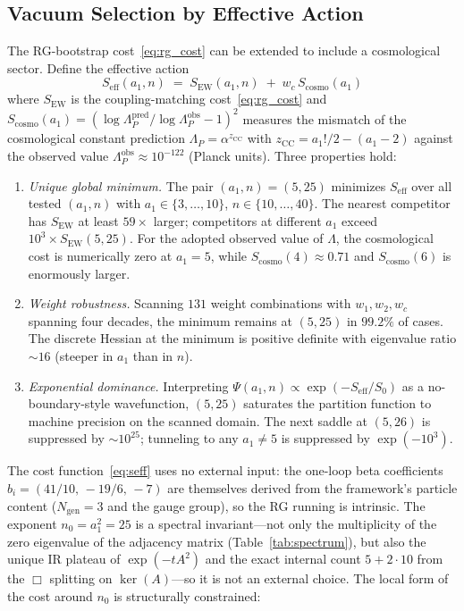 \documentclass[12pt,a4paper]{article}
\theoremstyle{definition}
\begin{document}
\subsection{Vacuum Selection by Effective Action}
\label{sec:vacuum_selection}

The RG-bootstrap cost~\eqref{eq:rg_cost} can be extended to include a cosmological sector.  Define the effective action
\begin{equation}
S_{\mathrm{eff}}(a_1, n) \;=\; S_{\mathrm{EW}}(a_1, n) \;+\; w_c\, S_{\mathrm{cosmo}}(a_1)
\label{eq:seff}
\end{equation}
where $S_{\mathrm{EW}}$ is the coupling-matching cost~\eqref{eq:rg_cost} and $S_{\mathrm{cosmo}}(a_1) = (\log\Lambda_P^{\mathrm{pred}} / \log\Lambda_P^{\mathrm{obs}} - 1)^2$ measures the mismatch of the cosmological constant prediction $\Lambda_P = \alpha^{z_{\mathrm{CC}}}$ with $z_{\mathrm{CC}} = a_1!/2 - (a_1-2)$ against the observed value $\Lambda_P^{\mathrm{obs}} \approx 10^{-122}$ (Planck units).  Three properties hold:
\begin{enumerate}
\item[(i)] \emph{Unique global minimum.}  The pair $(a_1, n) = (5, 25)$ minimizes $S_{\mathrm{eff}}$ over all tested $(a_1, n)$ with $a_1 \in \{3, \ldots, 10\}$, $n \in \{10, \ldots, 40\}$.  The nearest competitor has $S_{\mathrm{EW}}$ at least $59\times$ larger; competitors at different $a_1$ exceed $10^3 \times S_{\mathrm{EW}}(5,25)$.  For the adopted observed value of $\Lambda$, the cosmological cost is numerically zero at $a_1=5$, while $S_{\mathrm{cosmo}}(4) \approx 0.71$ and $S_{\mathrm{cosmo}}(6)$ is enormously larger.
\item[(ii)] \emph{Weight robustness.}  Scanning $131$ weight combinations with $w_1, w_2, w_c$ spanning four decades, the minimum remains at $(5, 25)$ in $99.2\%$ of cases.  The discrete Hessian at the minimum is positive definite with eigenvalue ratio $\sim\!16$ (steeper in $a_1$ than in $n$).
\item[(iii)] \emph{Exponential dominance.}  Interpreting $\Psi(a_1,n) \propto \exp(-S_{\mathrm{eff}}/S_0)$ as a no-boundary-style wavefunction, $(5,25)$ saturates the partition function to machine precision on the scanned domain.  The next saddle at $(5,26)$ is suppressed by $\sim 10^{25}$; tunneling to any $a_1 \neq 5$ is suppressed by $\exp(-10^3)$.
\end{enumerate}
The cost function~\eqref{eq:seff} uses no external input: the one-loop beta coefficients $b_i = (41/10,\,-19/6,\,-7)$ are themselves derived from the framework's particle content ($N_{\text{gen}} = 3$ and the gauge group), so the RG running is intrinsic.  The exponent $n_0 = a_1^2 = 25$ is a spectral invariant---not only the multiplicity of the zero eigenvalue of the adjacency matrix (Table~\ref{tab:spectrum}), but also the unique IR plateau of $\exp(-tA^2)$ and the exact internal count $5 + 2\cdot10$ from the $\Box$ splitting on $\ker(A)$---so it is not an external choice.  The local form of the cost around $n_0$ is structurally constrained:
\end{document}
